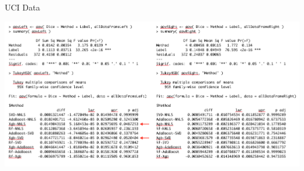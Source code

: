 \documentclass[ignorenonframetext,]{beamer}
\begin{document}
\begin{frame}{UCI Data}

\centering
\includegraphics[width=1 \textwidth]{../Figures/uciResults.png}

\hypertarget{refs}{}

\end{frame}
\end{document}
